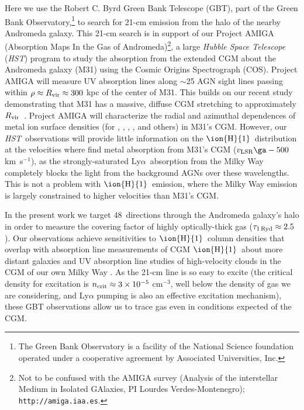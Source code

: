 \documentclass[12pt,preprint]{aastex6}
\newcommand{\qsonumber}{48}
\newcommand{\HI}{\ensuremath{\mbox{\ion{H}{1}}}}
\newcommand{\lya}{Ly$\alpha$\relax}
\newcommand{\Rvir}{\ensuremath{R_{\rm vir}}\relax}
\newcommand{\percc}{cm$^{-3}$}
\newcommand{\kms}{km~s$^{-1}$}
\newcommand{\hst}{{\em HST}}
\newcommand{\vlsr}{\ensuremath{v_{\rm LSR}\relax}}
\begin{document}
Here we use the Robert C. Byrd Green Bank Telescope (GBT), part of the
Green Bank Observatory,\footnote{The Green Bank Observatory is a
  facility of the National Science foundation operated under a
  cooperative agreement by Associated Universities, Inc.} to search
for 21-cm emission from the halo of the nearby Andromeda galaxy. This
21-cm search is in support of our Project AMIGA (Absorption Maps In
the Gas of Andromeda)\footnote{Not to be confused with the AMIGA
  survey (Analysis of the interstellar Medium in Isolated GAlaxies, PI
  Lourdes Verdes-Montenegro); {\tt http://amiga.iaa.es}.}, a large
{\em Hubble Space Telescope} (\hst) program to study the absorption
from the extended CGM about the Andromeda galaxy (M31) using the
Cosmic Origins Spectrograph (COS). Project AMIGA will measure UV
absorption lines along $\sim$25 AGN sight lines passing within
$\rho \approx \Rvir \approx 300$ kpc of the center of M31. This builds
on our recent study demonstrating that M31 has a massive, diffuse CGM
stretching to approximately \Rvir\ \citep[][hereafter
]{lehner2015}. Project AMIGA will characterize
the radial and azimuthal dependences of metal ion surface densities
(for , ,  , , and
others) in M31's CGM. However, our \hst\ observations will provide
little information on the \HI\ distribution at the velocities where
 find metal absorption from M31's CGM
($\vlsr \ga -500$ \kms), as the strongly-saturated \lya\ absorption
from the Milky Way completely blocks the light from the background
AGNs over these wavelengths. This is not a problem with \HI\ emission,
where the Milky Way emission is largely constrained to higher
velocities than M31's CGM.

In the present work we target \qsonumber\ directions through the
Andromeda galaxy's halo in order to measure the covering factor of
highly optically-thick gas ($\tau_{\rm 1\, Ryd} \approx 2.5$). Our
observations achieve sensitivities to \HI\ column densities that
overlap with absorption line measurements of CGM \HI\ about more
distant galaxies \citep[e.g.,][]{tumlinson2013, lehner2013,
  prochaska2017} and UV absorption line studies of high-velocity
clouds in the CGM of our own Milky Way \citep[e.g.,][]{fox2006}. As
the 21-cm line is so easy to excite (the critical density for
excitation is $n_{\rm crit} \approx 3\times10^{-5}$ \percc , well
below the density of gas we are considering, and Ly$\alpha$ pumping is
also an effective excitation mechanism), these GBT observations allow
us to trace gas even in conditions expected of the CGM.
\end{document}
